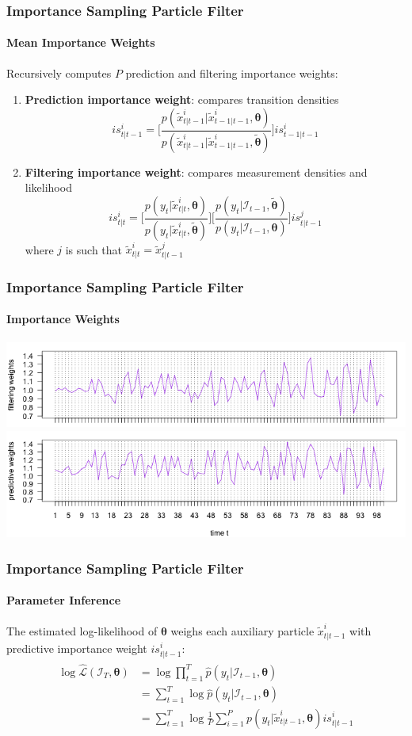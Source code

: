\documentclass[11pt]{beamer}
\begin{document}
\begin{frame}
\frametitle{Importance Sampling Particle Filter}
\framesubtitle{Mean Importance Weights}
Recursively computes $P$ prediction and filtering importance weights:
\begin{enumerate}
	\item \textbf{Prediction importance weight}: compares transition densities
	$$
	is_{t|t-1}^i = \bigg[ \frac{p(\tilde{x}_{t|t-1}^i | \tilde{x}_{t-1|t-1}^i, \boldsymbol{\theta})}{p(\tilde{x}_{t|t-1}^i | \tilde{x}_{t-1|t-1}^i, \boldsymbol{\tilde{\theta}})} \bigg] is_{t-1|t-1}^i	
	$$  
	\item \textbf{Filtering importance weight}: compares measurement densities and likelihood	
	$$
	is_{t|t}^i = \bigg[ \frac{p(y_t | \tilde{x}_{t|t}^i, \boldsymbol{\theta})}{p(y_t | \tilde{x}_{t|t}^i, \boldsymbol{\tilde{\theta}})} \bigg] \bigg[ \frac{p(y_t | \mathcal{I}_{t-1}, \boldsymbol{\tilde{\theta}})}{p(y_t | \mathcal{I}_{t-1}, \boldsymbol{\theta})} \bigg] is_{t|t-1}^j		
	$$ 
	where $j$ is such that $\tilde{x}_{t|t}^i = \tilde{x}_{t|t-1}^j$
\end{enumerate}
\end{frame}

\begin{frame}
\frametitle{Importance Sampling Particle Filter}
\framesubtitle{Importance Weights}
\centering
\includegraphics[scale=0.45]{ullm_is_filt_weights_P200}\\
\includegraphics[scale=0.45]{ullm_is_pred_weights_P200}
\end{frame}

\begin{frame}
\frametitle{Importance Sampling Particle Filter}
\framesubtitle{Parameter Inference}
The estimated log-likelihood of $\boldsymbol{\theta}$ weighs each auxiliary particle $\tilde{x}_{t|t-1}^i$ with predictive importance weight $is_{t|t-1}^i$: 
\begin{align*} 
\begin{split}
\log \hat{\mathcal{L}}(\mathcal{I}_T, \boldsymbol{\theta}) &= \log \prod_{t=1}^T \hat{p}(y_t | \mathcal{I}_{t-1}, \boldsymbol{\theta}) \\
&= \sum_{t=1}^T \log \hat{p}(y_t | \mathcal{I}_{t-1}, \boldsymbol{\theta}) \\
&= \sum_{t=1}^T \log \frac{1}{P} \sum_{i=1}^P p(y_t | \tilde{x}_{t|t-1}^i, \boldsymbol{\theta}) is_{t|t-1}^i \\
\end{split}					
\end{align*} 
\end{frame}
\end{document}
